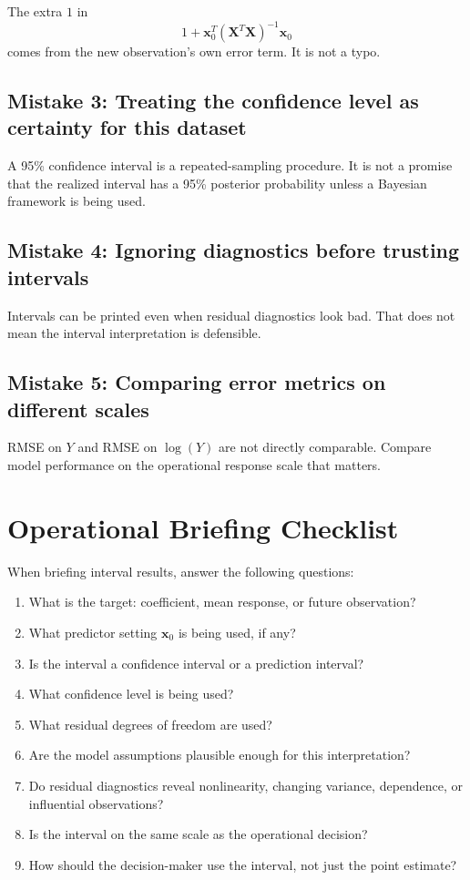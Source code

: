 The extra \(1\) in
\begin{equation}
  1+\mathbf{x}_0^T(\mathbf{X}^T\mathbf{X})^{-1}\mathbf{x}_0
\end{equation}
comes from the new observation's own error term.  It is not a typo.

\subsection*{Mistake 3: Treating the confidence level as certainty for this dataset}

A 95\% confidence interval is a repeated-sampling procedure.  It is not a promise that the realized interval has a 95\% posterior probability unless a Bayesian framework is being used.

\subsection*{Mistake 4: Ignoring diagnostics before trusting intervals}

Intervals can be printed even when residual diagnostics look bad.  That does not mean the interval interpretation is defensible.

\subsection*{Mistake 5: Comparing error metrics on different scales}

RMSE on \(Y\) and RMSE on \(\log(Y)\) are not directly comparable.  Compare model performance on the operational response scale that matters.

\section{Operational Briefing Checklist}

When briefing interval results, answer the following questions:
\begin{enumerate}
  \item What is the target: coefficient, mean response, or future observation?
  \item What predictor setting \(\mathbf{x}_0\) is being used, if any?
  \item Is the interval a confidence interval or a prediction interval?
  \item What confidence level is being used?
  \item What residual degrees of freedom are used?
  \item Are the model assumptions plausible enough for this interpretation?
  \item Do residual diagnostics reveal nonlinearity, changing variance, dependence, or influential observations?
  \item Is the interval on the same scale as the operational decision?
  \item How should the decision-maker use the interval, not just the point estimate?
\end{enumerate}

